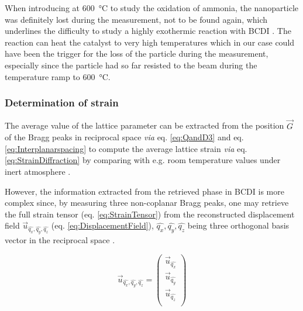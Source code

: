 {When introducing  at \qty{600}{\degreeCelsius} to study the oxidation of ammonia, the nanoparticle was definitely lost during the measurement, not to be found again, which underlines the difficulty to study a highly exothermic reaction with BCDI \parencite{PerezRamirez2004, Hatscher2008}.
The reaction can heat the catalyst to very high temperatures which in our case could have been the trigger for the loss of the particle during the measurement, especially since the particle had so far resisted to the beam during the temperature ramp to \qty{600}{\degreeCelsius}.

\subsubsection{Determination of strain}

The average value of the lattice parameter can be extracted from the position $\vec{G}$ of the Bragg peaks in reciprocal space \textit{via} eq. \ref{eq:QandD3} and eq. \ref{eq:Interplanarspacing} to compute the average lattice strain \textit{via} eq. \ref{eq:StrainDiffraction} by comparing with e.g. room temperature values under inert atmosphere \parencite{Fernandez2019}.

However, the information extracted from the retrieved phase in BCDI is more complex since, by measuring three non-coplanar Bragg peaks, one may retrieve the full strain tensor (eq. \ref{eq:StrainTensor}) from the reconstructed displacement field $\vec{u}_{\hat{q_x}, \hat{q_y}, \hat{q_z}}$ (eq. \ref{eq:DisplacementField}), $\hat{q_x}, \hat{q_y}, \hat{q_z}$ being three orthogonal basis vector in the reciprocal space \parencite{Karpov2019}.

\begin{equation}
    \vec{u}_{\hat{q_x}, \hat{q_y}, \hat{q_z}} =
     \begin{pmatrix}
        \vec{u}_{\hat{q_x}} \\
        \vec{u}_{\hat{q_y}} \\
        \vec{u}_{\hat{q_z}} \\
     \end{pmatrix}
     \label{eq:DisplacementField}
\end{equation}

}
